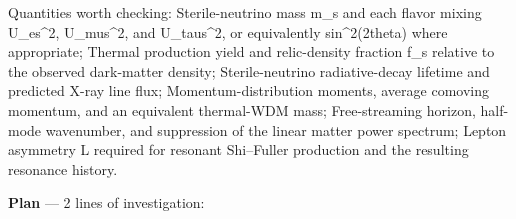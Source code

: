 \documentclass[11pt,a4paper]{article}
\begin{document}
Quantities worth checking: Sterile-neutrino mass m\_s and each flavor mixing \textbar{}U\_es\textbar{}\textasciicircum{}2, \textbar{}U\_mus\textbar{}\textasciicircum{}2, and \textbar{}U\_taus\textbar{}\textasciicircum{}2, or equivalently sin\textasciicircum{}2(2theta) where appropriate; Thermal production yield and relic-density fraction f\_s relative to the observed dark-matter density; Sterile-neutrino radiative-decay lifetime and predicted X-ray line flux; Momentum-distribution moments, average comoving momentum, and an equivalent thermal-WDM mass; Free-streaming horizon, half-mode wavenumber, and suppression of the linear matter power spectrum; Lepton asymmetry L required for resonant Shi--Fuller production and the resulting resonance history.

\textbf{Plan} --- 2 lines of investigation:
\end{document}
